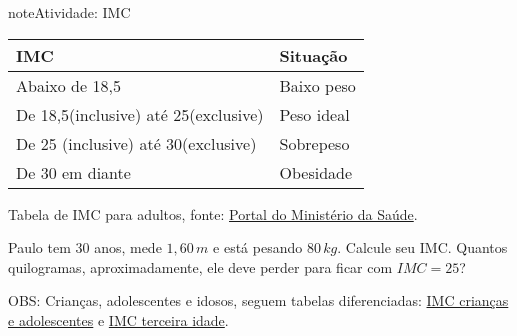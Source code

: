 \begin{sphinxadmonition}{note}{Atividade: IMC}
\begin{enumerate}
\begin{savenotes}\sphinxattablestart
\centering
\begin{tabulary}{\linewidth}[t]{|T|T|}
\hline

IMC
&
Situação
\\
\hline
Abaixo de 18,5
&
Baixo peso
\\
\hline
De 18,5(inclusive) até
25(exclusive)
&
Peso ideal
\\
\hline
De 25 (inclusive) até
30(exclusive)
&
Sobrepeso
\\
\hline
De 30 em diante
&
Obesidade
\\
\hline
\end{tabulary}
\par
\sphinxattableend\end{savenotes}

Tabela de IMC para adultos, fonte: \href{http://portalms.saude.gov.br/component/content/article/804-imc/40509-imc-em-adultos}{Portal do Ministério da Saúde}.

Paulo tem \(30\) anos, mede \(1,60\,m\) e está pesando \(80\,kg\). Calcule seu IMC. Quantos quilogramas, aproximadamente, ele deve perder para ficar com \(IMC=25\)?

\end{enumerate}

OBS: Crianças, adolescentes e idosos, seguem tabelas diferenciadas: \href{http://www.saude.gov.br/component/content/article/804-imc/40510-imc-em-criancas-e-adolescentes}{IMC crianças e adolescentes} e \href{http://www.saude.gov.br/component/content/article/804-imc/40511-avaliacao-do-peso-imc-na-terceira-idade}{IMC terceira idade}.
\end{sphinxadmonition}

